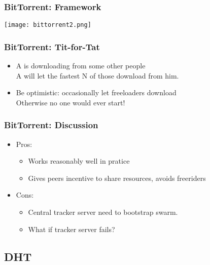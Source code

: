 \begin{frame}
    \frametitle{BitTorrent: Framework}
    \texttt{[image: bittorrent2.png]}
\end{frame}

\begin{frame}
    \frametitle{BitTorrent: Tit-for-Tat}
    \begin{itemize}
        \item A is downloading from some other people \\
            A will let the fastest N of those download from him.
        \item Be optimistic: occasionally let freeloaders download \\
            Otherwise no one would ever start!
    \end{itemize}
\end{frame}

\begin{frame}
    \frametitle{BitTorrent: Discussion}
    \begin{itemize}
        \item Pros:
        \begin{itemize}
            \item Works reasonably well in pratice
            \item Gives peers incentive to share resources, avoids freeriders
        \end{itemize}
        \item Cons:
        \begin{itemize}
            \item Central tracker server need to bootstrap swarm.
            \item What if tracker server fails?
        \end{itemize}
    \end{itemize}
\end{frame}

\subsection{DHT}

